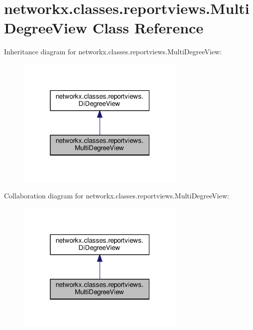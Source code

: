 \hypertarget{classnetworkx_1_1classes_1_1reportviews_1_1MultiDegreeView}{}\section{networkx.\+classes.\+reportviews.\+Multi\+Degree\+View Class Reference}
\label{classnetworkx_1_1classes_1_1reportviews_1_1MultiDegreeView}


Inheritance diagram for networkx.\+classes.\+reportviews.\+Multi\+Degree\+View\+:
\nopagebreak
\begin{figure}[H]
\begin{center}
\leavevmode
\includegraphics[width=229pt]{classnetworkx_1_1classes_1_1reportviews_1_1MultiDegreeView__inherit__graph}
\end{center}
\end{figure}


Collaboration diagram for networkx.\+classes.\+reportviews.\+Multi\+Degree\+View\+:
\nopagebreak
\begin{figure}[H]
\begin{center}
\leavevmode
\includegraphics[width=229pt]{classnetworkx_1_1classes_1_1reportviews_1_1MultiDegreeView__coll__graph}
\end{center}
\end{figure}
